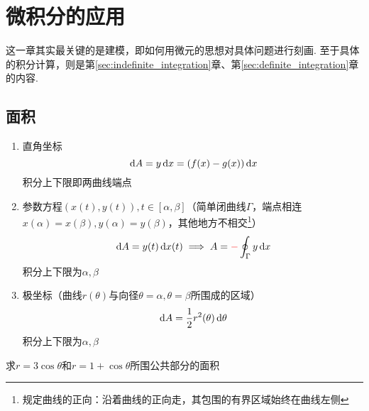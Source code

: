 
\section{微积分的应用}
这一章其实最关键的是建模，即如何用微元的思想对具体问题进行刻画. 至于具体的积分计算，则是第\ref{sec:indefinite_integration}章、第\ref{sec:definite_integration}章的内容.
\subsection{面积}
\begin{enumerate}
	\item 直角坐标
	\[\,\mathrm{d} A=y\,\mathrm{d} x=(f(x)-g(x))\,\mathrm{d} x\]
	积分上下限即两曲线端点
	\item 参数方程$(x(t),y(t)),t\in[\alpha,\beta]$（简单闭曲线$\Gamma$，端点相连$x(\alpha)=x(\beta),y(\alpha)=y(\beta)$，其他地方不相交\footnote{规定曲线的正向：沿着曲线的正向走，其包围的有界区域始终在曲线左侧}）
	\[\,\mathrm{d} A=y(t)\,\mathrm{d} x(t)\implies A=\textcolor{red}{-}\oint_\Gamma y\,\mathrm{d} x\]
	积分上下限为$\alpha,\beta$
	\item 极坐标（曲线$r(\theta)$与向径$\theta=\alpha,\theta=\beta$所围成的区域）
	\[\,\mathrm{d} A=\dfrac{1}{2}r^2(\theta)\,\mathrm{d}\theta\]
	积分上下限为$\alpha,\beta$
\end{enumerate}
\begin{example}
求$r=3\cos\theta$和$r=1+\cos\theta$所围公共部分的面积
\end{example}
